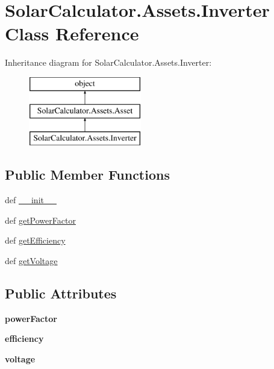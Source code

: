 \hypertarget{class_solar_calculator_1_1_assets_1_1_inverter}{\section{Solar\-Calculator.\-Assets.\-Inverter Class Reference}
\label{class_solar_calculator_1_1_assets_1_1_inverter}
}
Inheritance diagram for Solar\-Calculator.\-Assets.\-Inverter\-:\begin{figure}[H]
\begin{center}
\leavevmode
\includegraphics[height=3.000000cm]{class_solar_calculator_1_1_assets_1_1_inverter}
\end{center}
\end{figure}
\subsection*{Public Member Functions}
\begin{DoxyCompactItemize}
\item 
def \hyperlink{class_solar_calculator_1_1_assets_1_1_inverter_ab8d377d7bd2f2bb97a71df32abf7f792}{\-\_\-\-\_\-init\-\_\-\-\_\-}
\item 
def \hyperlink{class_solar_calculator_1_1_assets_1_1_inverter_a5273153f86c75e47be9bd3b36fbb8856}{get\-Power\-Factor}
\item 
def \hyperlink{class_solar_calculator_1_1_assets_1_1_inverter_ad929057b96481cb632c30579458f145b}{get\-Efficiency}
\item 
def \hyperlink{class_solar_calculator_1_1_assets_1_1_inverter_afe3c16cfaca3436e1644423751833bb5}{get\-Voltage}
\end{DoxyCompactItemize}
\subsection*{Public Attributes}
\begin{DoxyCompactItemize}
\item 
\hypertarget{class_solar_calculator_1_1_assets_1_1_inverter_a259a55992aa755fc4a9bf0f04921252b}{{\bfseries power\-Factor}}\label{class_solar_calculator_1_1_assets_1_1_inverter_a259a55992aa755fc4a9bf0f04921252b}

\item 
\hypertarget{class_solar_calculator_1_1_assets_1_1_inverter_a929d2ec464ad85d6f015072225ba4103}{{\bfseries efficiency}}\label{class_solar_calculator_1_1_assets_1_1_inverter_a929d2ec464ad85d6f015072225ba4103}

\item 
\hypertarget{class_solar_calculator_1_1_assets_1_1_inverter_a8f245100d501a8425ff7d992076eff10}{{\bfseries voltage}}\label{class_solar_calculator_1_1_assets_1_1_inverter_a8f245100d501a8425ff7d992076eff10}

\end{DoxyCompactItemize}
